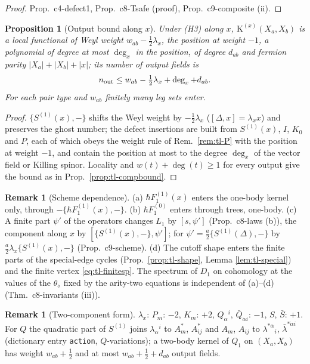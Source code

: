 \documentclass[11pt]{article}
\numberwithin{equation}{section}
\theoremstyle{plain}
\newtheorem{proposition}[theorem]{Proposition}
\theoremstyle{definition}
\newtheorem{remark}[theorem]{Remark}
\begin{document}
\begin{proof}
Prop.~c4-defect1, Prop.~c8-Tsafe (proof), Prop.~c9-composite (ii).
\end{proof}

\begin{proposition}[Output bound along $x$]
\label{prop:tl-bound1}
Under (H3) along $x$, $\mathrm K^{(x)}(X_a,X_b)$ is a local functional of Weyl weight $w_{ab}-\tfrac12\lambda_x$, the position at weight $-1$, a polynomial of degree at most $\deg_x$ in the position, of degree $d_{ab}$ and fermion parity $|X_a|+|X_b|+|x|$; its number of output fields is
\[
n_{\rm out}\le w_{ab}-\tfrac12\lambda_x+\deg_x+d_{ab}.
\]
For each pair type and $w_{ab}$ finitely many leg sets enter.
\end{proposition}

\begin{proof}
$\{S^{(1)}(x),-\}$ shifts the Weyl weight by $-\tfrac12\lambda_x$ ($[\Delta,x]=\lambda_xx$) and preserves the ghost number; the defect insertions are built from $S^{(1)}(x)$, $I$, $K_0$ and $P$, each of which obeys the weight rule of Rem.~\ref{rem:tl-P} with the position at weight $-1$, and contain the position at most to the degree $\deg_x$ of the vector field or Killing spinor. Locality and $w(t)+\deg(t)\ge1$ for every output give the bound as in Prop.~\ref{prop:tl-compbound}.
\end{proof}

\begin{remark}[Scheme dependence]
\label{rem:tl-scheme1}
(a) $\hbar F_1^{(1)}(x)$ enters the one-body kernel only, through $-\{\hbar F_1^{(1)}(x),-\}$. (b) $\hbar F_1^{(0)}$ enters through trees, one-body. (c) A finite part $\psi'$ of the operators changes $L_1$ by $[s,\psi']$ (Prop.~c8-laws (b)), the component along $x$ by $[\{S^{(1)}(x),-\},\psi']$; for $\psi'=\tfrac a2\{S^{(1)}(\Delta),-\}$ by $\tfrac a2\lambda_x\{S^{(1)}(x),-\}$ (Prop.~c9-scheme). (d) The cutoff shape enters the finite parts of the special-edge cycles (Prop.~\ref{prop:tl-shape}, Lemma \ref{lem:tl-special}) and the finite vertex \eqref{eq:tl-finitesp}. The spectrum of $D_1$ on cohomology at the values of the $\theta_\diamond$ fixed by the arity-two equations is independent of (a)--(d) (Thm.~c8-invariants (iii)).
\end{remark}

\begin{remark}[Two-component form]
$\lambda_x$: $P_m$: $-2$, $K_m$: $+2$, $Q_\alpha{}^i$, $\bar Q_{\dot\alpha i}$: $-1$, $S$, $\bar S$: $+1$. For $Q$ the quadratic part of $S^{(1)}$ joins $\lambda_\alpha{}^i$ to $A^*_m$, $A^*_{ij}$ and $A_m$, $A_{ij}$ to $\lambda^{*\alpha}{}_i$, $\bar\lambda^{*\dot\alpha i}$ (dictionary entry \texttt{action}, $Q$-variations); a two-body kernel of $Q_1$ on $(X_a,X_b)$ has weight $w_{ab}+\tfrac12$ and at most $w_{ab}+\tfrac12+d_{ab}$ output fields.
\end{remark}
\end{document}
